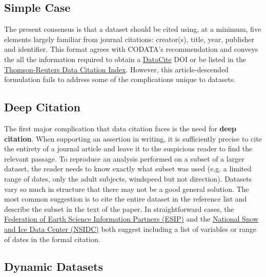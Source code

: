 \documentclass[10pt,twocolumn]{article}
\begin{document}
\subsection*{Simple Case}\label{simple-case}

The present consensus is that a dataset should be cited using, at a minimum, five elements largely familiar from journal citations: creator(s), title, year, publisher and identifier.
This format agrees with CODATA's recommendation\cite{codata-icsti_task_group_on_data_citation_standards_and_practices_out_2013} and conveys the all the information required to obtain a \href{http://www.datacite.org/}{DataCite} DOI\cite{datacite_datacite_2013} or be listed in the \href{http://thomsonreuters.com/data-citation-index/}{Thomson-Reuters Data Citation Index}.
However, this article-descended formulation fails to address some of the complications unique to datasets.

\subsection*{Deep Citation}\label{deep-citation}

The first major complication that data citation faces is the need for \textbf{deep citation}.
When supporting an assertion in writing, it is sufficiently precise to cite the entirety of a journal article and leave it to the suspicious reader to find the relevant passage.
To reproduce an analysis performed on a subset of a larger dataset, the reader needs to know exactly what subset was used (e.g. a limited range of dates, only the adult subjects, windspeed but not direction).
Datasets vary so much in structure that there may not be a good general solution.
The most common suggestion is to cite the entire dataset in the reference list and describe the subset in the text of the paper.\cite{altman_a_2007,}
In straightforward cases, the \href{http://wiki.esipfed.org/index.php/Interagency_Data_Stewardship/Citations/provider_guidelines#Subset_Used}{Federation of Earth Science Information Partners (ESIP)} and the \href{http://nsidc.org/about/use_copyright.html}{National Snow and Ice Data Center (NSIDC)} both suggest including a list of variables or range of dates in the formal citation.

\subsection*{Dynamic Datasets}\label{dynamic-data}
\end{document}
